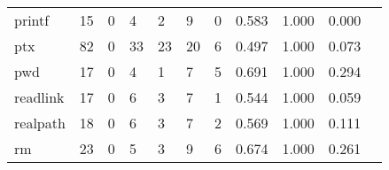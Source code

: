 \begin{longtable}{lp{1.2cm}p{1.2cm}p{1.2cm}p{1.2cm}p{1.2cm}p{1.2cm}p{1.2cm}p{1.2cm}p{1.2cm}p{1.2cm}}
printf    &                                    15 &                                                  0 &                                                  4 &                                                  2 &                                                  9 &                                                  0 &                                              0.583 &                                              1.000 &                                              0.000 \\
ptx       &                                    82 &                                                  0 &                                                 33 &                                                 23 &                                                 20 &                                                  6 &                                              0.497 &                                              1.000 &                                              0.073 \\
pwd       &                                    17 &                                                  0 &                                                  4 &                                                  1 &                                                  7 &                                                  5 &                                              0.691 &                                              1.000 &                                              0.294 \\
readlink  &                                    17 &                                                  0 &                                                  6 &                                                  3 &                                                  7 &                                                  1 &                                              0.544 &                                              1.000 &                                              0.059 \\
realpath  &                                    18 &                                                  0 &                                                  6 &                                                  3 &                                                  7 &                                                  2 &                                              0.569 &                                              1.000 &                                              0.111 \\
rm        &                                    23 &                                                  0 &                                                  5 &                                                  3 &                                                  9 &                                                  6 &                                              0.674 &                                              1.000 &                                              0.261 \\

\end{longtable}
